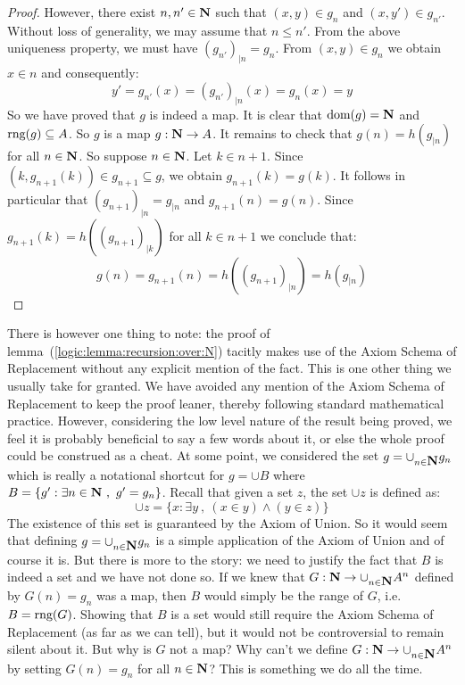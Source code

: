 \begin{proof}
However, there exist $n,n'\in\mbox{$\bf N$}$ such that $(x,y)\in g_{n}$ and
$(x,y')\in g_{n'}$. Without loss of generality, we may assume that
$n\leq n'$. From the above uniqueness property, we must have
$(g_{n'})_{|n}=g_{n}$. From $(x,y)\in g_{n}$ we obtain $x\in n$ and
consequently:
    \[
    y'=g_{n'}(x)=(g_{n'})_{|n}(x)=g_{n}(x)=y
    \]
So we have proved that $g$ is indeed a map. It is clear that
$\mbox{\rm dom}(g)=\mbox{$\bf N$}$ and $\mbox{\rm rng}(g)\subseteq A$. So $g$ is a map $g:\mbox{$\bf N$}\to A$.
It remains to check that $g(n)=h(g_{|n})$ for all $n\in\mbox{$\bf N$}$. So
suppose $n\in\mbox{$\bf N$}$. Let $k\in n+1$. Since $(k,g_{n+1}(k))\in
g_{n+1}\subseteq g$, we obtain $g_{n+1}(k)=g(k)$. It follows in
particular that $(g_{n+1})_{|n}=g_{|n}$ and $g_{n+1}(n)=g(n)$. Since
$g_{n+1}(k)=h((g_{n+1})_{|k})$ for all $k\in n+1$ we conclude that:
    \[
    g(n)=g_{n+1}(n)=h((g_{n+1})_{|n})=h(g_{|n})
    \]
\end{proof}

There is however one thing to note: the proof of
lemma~(\ref{logic:lemma:recursion:over:N}) tacitly makes use of the
Axiom Schema of Replacement without any explicit mention of the
fact. This is one other thing we usually take for granted. We have
avoided any mention of the Axiom Schema of Replacement to keep the
proof leaner, thereby following standard mathematical practice.
However, considering the low level nature of the result being
proved, we feel it is probably beneficial to say a few words about
it, or else the whole proof could be construed as a cheat. At some
point, we considered the set $g=\cup_{n\in\mbox{$\bf N$}} g_{n}$ which is really
a notational shortcut for $g=\cup B$ where $B=\{g':\exists n\in\mbox{$\bf N$}\
,\ g'=g_{n}\}$. Recall that given a set $z$, the set $\cup z$ is
defined as:
    \[
    \cup z = \{x:\exists y\ ,\ (x\in y)\land(y\in z)\}
    \]
The existence of this set is guaranteed by the Axiom of Union. So it
would seem that defining $g=\cup_{n\in\mbox{$\bf N$}}g_{n}$ is a simple
application of the Axiom of Union and of course it is. But there is
more to the story: we need to justify the fact that $B$ is indeed a
set and we have not done so. If we knew that
$G:\mbox{$\bf N$}\to\cup_{n\in\mbox{$\bf N$}}A^{n}$ defined by $G(n)=g_{n}$ was a map, then
$B$ would simply be the range of $G$, i.e. $B=\mbox{\rm rng}(G)$. Showing that
$B$ is a set would still require the Axiom Schema of Replacement (as
far as we can tell), but it would not be controversial to remain
silent about it. But why is $G$ not a map? Why can't we define
$G:\mbox{$\bf N$}\to\cup_{n\in\mbox{$\bf N$}}A^{n}$ by setting $G(n)=g_{n}$ for all
$n\in\mbox{$\bf N$}$? This is something we do all the time.

